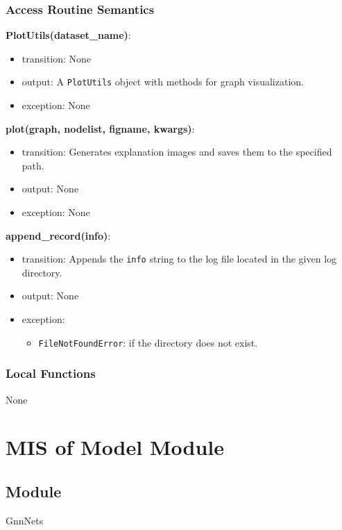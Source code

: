 \documentclass[12pt, titlepage]{article}
\begin{document}
\subsubsection{Access Routine Semantics}

\noindent \textbf{PlotUtils(dataset\_name)}:
\begin{itemize}
  \item transition: None
  \item output: A \texttt{PlotUtils} object with methods for graph visualization.
  \item exception: None
\end{itemize}


\noindent \textbf{plot(graph, nodelist, figname, kwargs)}:
\begin{itemize}
  \item transition: Generates explanation images and saves them to the specified path.
  \item output: None
  \item exception: None
\end{itemize}


\noindent \textbf{append\_record(info)}:
\begin{itemize}
  \item transition: Appends the \texttt{info} string to the log file located in the given log directory.
  \item output: None
  \item exception: 
  \begin{itemize}
    \item \texttt{FileNotFoundError}: if the directory does not exist.
  \end{itemize}
\end{itemize}



\subsubsection{Local Functions}
None









\section{MIS of Model Module} \label{Model}

\subsection{Module}
GnnNets
\end{document}
